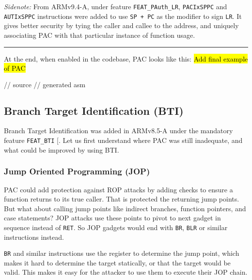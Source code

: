 \documentclass[a4paper, nobind]{templates/ociamthesis}
\newenvironment{Shaded}{\begin{snugshade}}{\end{snugshade}}
\newcommand{\NormalTok}[1]{#1}
\renewenvironment{Shaded}
{
  \vspace{10pt}%
  \begin{snugshade}%
}{%
  \end{snugshade}%
  \vspace{8pt}%
}
\begin{document}
\emph{Sidenote:}
From ARMv9.4-A, under feature \texttt{FEAT\_PAuth\_LR}, \texttt{PACIxSPPC} and \texttt{AUTIxSPPC}
instructions were added to use \texttt{SP\ +\ PC} as the modifier to sign \texttt{LR}.
It gives better security by tying the caller and callee to the address,
and uniquely associating PAC with that particular instance of function usage.

\begin{center}\rule{0.5\linewidth}{0.5pt}\end{center}

At the end, when enabled in the codebase, PAC looks like this:
\hl{Add final example of PAC}

\begin{Shaded}
\begin{Highlighting}[]
\NormalTok{// source}
\NormalTok{// generated asm}
\end{Highlighting}
\end{Shaded}

\subsection{Branch Target Identification (BTI)}\label{bti-bg}

Branch Target Identification was added in ARMv8.5-A under the mandatory feature \texttt{FEAT\_BTI} {[}\citeproc{ref-arm-feat-names}{13}{]}.
Let us first understand where PAC was still inadequate, and what could be improved by using BTI.

\subsubsection{Jump Oriented Programming (JOP)}\label{jump-oriented-programming-jop}

PAC could add protection against ROP attacks by adding checks to ensure a
function returns to its true caller. That is protected the returning jump points.
But what about calling jump points like indirect branches, function pointers,
and case statements? JOP attacks use these points to pivot to next gadget in
sequence instead of \texttt{RET}. So JOP gadgets would end with \texttt{BR}, \texttt{BLR} or similar instructions instead.

\texttt{BR} and similar instructions use the register to determine the jump point, which
makes it hard to determine the target statically, or that the target would be valid.
This makes it easy for the attacker to use them to execute their JOP chain.
\end{document}
